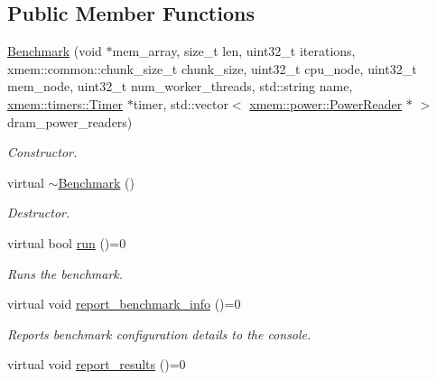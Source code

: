 \subsection*{Public Member Functions}
\begin{DoxyCompactItemize}
\item 
\hyperlink{classxmem_1_1benchmark_1_1_benchmark_a6eda9023866fc80e334d7d8d2a220817}{Benchmark} (void $\ast$mem\+\_\+array, size\+\_\+t len, uint32\+\_\+t iterations, xmem\+::common\+::chunk\+\_\+size\+\_\+t chunk\+\_\+size, uint32\+\_\+t cpu\+\_\+node, uint32\+\_\+t mem\+\_\+node, uint32\+\_\+t num\+\_\+worker\+\_\+threads, std\+::string name, \hyperlink{classxmem_1_1timers_1_1_timer}{xmem\+::timers\+::\+Timer} $\ast$timer, std\+::vector$<$ \hyperlink{classxmem_1_1power_1_1_power_reader}{xmem\+::power\+::\+Power\+Reader} $\ast$ $>$ dram\+\_\+power\+\_\+readers)
\begin{DoxyCompactList}\small\item\em Constructor. \end{DoxyCompactList}\item 
\hypertarget{classxmem_1_1benchmark_1_1_benchmark_a20476e07f09e2b20ed3e9a7f13a570e6}{}virtual \hyperlink{classxmem_1_1benchmark_1_1_benchmark_a20476e07f09e2b20ed3e9a7f13a570e6}{$\sim$\+Benchmark} ()\label{classxmem_1_1benchmark_1_1_benchmark_a20476e07f09e2b20ed3e9a7f13a570e6}

\begin{DoxyCompactList}\small\item\em Destructor. \end{DoxyCompactList}\item 
virtual bool \hyperlink{classxmem_1_1benchmark_1_1_benchmark_aa0dbe60e525457770c835c6c72a0be6a}{run} ()=0
\begin{DoxyCompactList}\small\item\em Runs the benchmark. \end{DoxyCompactList}\item 
\hypertarget{classxmem_1_1benchmark_1_1_benchmark_ae788ccb9d65f543b1bc59f963ec5f2e2}{}virtual void \hyperlink{classxmem_1_1benchmark_1_1_benchmark_ae788ccb9d65f543b1bc59f963ec5f2e2}{report\+\_\+benchmark\+\_\+info} ()=0\label{classxmem_1_1benchmark_1_1_benchmark_ae788ccb9d65f543b1bc59f963ec5f2e2}

\begin{DoxyCompactList}\small\item\em Reports benchmark configuration details to the console. \end{DoxyCompactList}\item 
\hypertarget{classxmem_1_1benchmark_1_1_benchmark_ad9b74db44f972909dcba85dd32cef0a3}{}virtual void \hyperlink{classxmem_1_1benchmark_1_1_benchmark_ad9b74db44f972909dcba85dd32cef0a3}{report\+\_\+results} ()=0\label{classxmem_1_1benchmark_1_1_benchmark_ad9b74db44f972909dcba85dd32cef0a3}


\end{DoxyCompactItemize}
